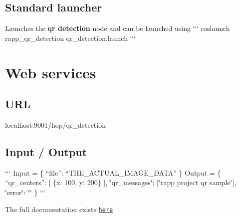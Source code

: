 \subsection*{Standard launcher}

Launches the {\bfseries qr detection} node and can be launched using ``` roslaunch rapp\-\_\-qr\-\_\-detection qr\-\_\-detection.\-launch ```

\section*{Web services}

\subsection*{U\-R\-L}

{\ttfamily localhost\-:9001/hop/qr\-\_\-detection}

\subsection*{Input / Output}

``` Input = \{ “file”\-: “\-T\-H\-E\-\_\-\-A\-C\-T\-U\-A\-L\-\_\-\-I\-M\-A\-G\-E\-\_\-\-D\-A\-T\-A” \} {\ttfamily  } Output = \{ “qr\-\_\-centers”\-: \mbox{[} \{x\-: 100, y\-: 200\} \mbox{]}, \char`\"{}qr\-\_\-messages\char`\"{}\-: \mbox{[}\char`\"{}rapp project qr sample\char`\"{}\mbox{]}, \char`\"{}error\char`\"{}\-: \char`\"{}\char`\"{} \} ```

The full documentation exists \href{https://github.com/rapp-project/rapp-platform/tree/master/rapp_web_services/services#qr-detection}{\tt here} 